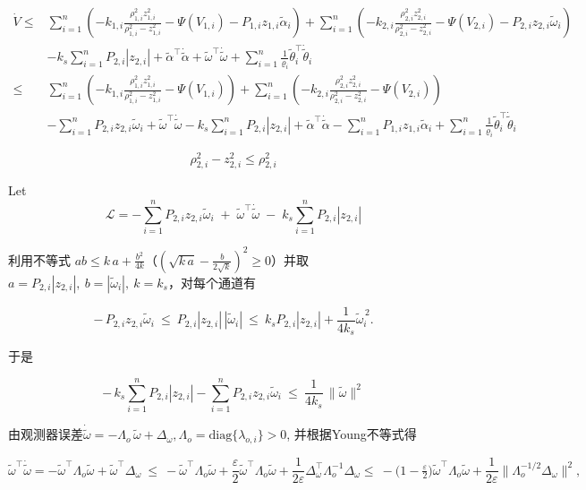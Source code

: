 \documentclass[pdflatex,sn-mathphys-num]{sn-jnl}%
\theoremstyle{thmstyleone}%
\theoremstyle{thmstyletwo}%
\theoremstyle{thmstylethree}%
\begin{document}
\begin{equation}\label{eq:45}
	\begin{aligned}
		\dot{V} \le&\sum_{i=1}^n \left( - k_{1,i}\frac{\rho_{1,i}^2 z_{1,i}^2}{\rho_{1,i}^2-z_{1,i}^2}-\Psi(V_{1,i})-P_{1,i}z_{1,i}\tilde\alpha_i\right)
		+\sum_{i=1}^n \left( - k_{2,i}\frac{\rho_{2,i}^2 z_{2,i}^2}{\rho_{2,i}^2-z_{2,i}^2}-\Psi(V_{2,i})-P_{2,i}z_{2,i}\tilde{\omega}_i  \right)\\
		& -k_s\sum_{i=1}^n P_{2,i} \left\lvert z_{2,i}\right\rvert +\tilde\alpha^\top \dot{\tilde \alpha}+\tilde \omega^\top \dot{\tilde \omega}+\sum_{i=1}^n\tfrac{1}{\varrho_i}\tilde \theta_i^\top \dot{\tilde \theta}_i \\
		\le&\sum_{i=1}^n \left( - k_{1,i}\frac{\rho_{1,i}^2 z_{1,i}^2}{\rho_{1,i}^2-z_{1,i}^2}-\Psi(V_{1,i})\right)
		+\sum_{i=1}^n \left( - k_{2,i}\frac{\rho_{2,i}^2 z_{2,i}^2}{\rho_{2,i}^2-z_{2,i}^2}-\Psi(V_{2,i})  \right)\\
		& -\sum_{i=1}^nP_{2,i}z_{2,i}\tilde{\omega}_i +\tilde \omega^\top \dot{\tilde \omega}-k_s\sum_{i=1}^n P_{2,i} \left\lvert z_{2,i}\right\rvert+\tilde\alpha^\top \dot{\tilde \alpha}-\sum_{i=1}^n P_{1,i}z_{1,i}\tilde\alpha_i+\sum_{i=1}^n\tfrac{1}{\varrho_i}\tilde \theta_i^\top \dot{\tilde \theta}_i 
	\end{aligned}
\end{equation}

$$
\rho_{2,i}^2 - z_{2,i}^2 \le \rho_{2,i}^2
$$



Let 
$$
\mathcal{L} =-\sum_{i=1}^nP_{2,i}z_{2,i}\tilde{\omega}_i\;+\;\tilde \omega^\top \dot{\tilde \omega}\;-\;k_s\sum_{i=1}^n P_{2,i} | z_{2,i} |
$$


利用不等式 $ab\le k\,a+\frac{b^2}{4k}$（$(\sqrt{k\,a}-\frac{b}{2\sqrt{k}})^2\ge0$）并取
$a=P_{2,i}|z_{2,i}|,\ b=|\tilde\omega_i|,\ k=k_s$，对每个通道有

$$
-\,P_{2,i}z_{2,i}\tilde\omega_i
\ \le\
P_{2,i}|z_{2,i}|\,|\tilde\omega_i|
\ \le\
k_s P_{2,i}|z_{2,i}|+\frac{1}{4k_s}\tilde\omega_i^{\,2}.
$$

于是

$$
-\,k_s\!\sum_{i=1}^n\! P_{2,i}|z_{2,i}|
-\sum_{i=1}^n P_{2,i}z_{2,i}\tilde\omega_i
\ \le\
\frac{1}{4k_s}\,\|\tilde\omega\|^2
$$


由观测器误差$
\dot{\tilde\omega}= -\Lambda_o\,\tilde\omega+\Delta_\omega,
\Lambda_o=\mathrm{diag}\{\lambda_{o,i}\}>0$, 并根据Young不等式得

$$
\tilde\omega^\top\dot{\tilde\omega}
= -\tilde\omega^\top\Lambda_o\tilde\omega+\tilde\omega^\top\Delta_\omega
\ \le\
-\tilde\omega^\top\Lambda_o\tilde\omega
+\frac{\varepsilon}{2}\tilde\omega^\top\Lambda_o\tilde\omega
+\frac{1}{2\varepsilon}\Delta_\omega^\top\Lambda_o^{-1}\Delta_\omega \le\
-\Big(1-\tfrac{\varepsilon}{2}\Big)\tilde\omega^\top\Lambda_o\tilde\omega
+\frac{1}{2\varepsilon}\big\|\Lambda_o^{-1/2}\Delta_\omega\big\|^2,
$$
\end{document}
